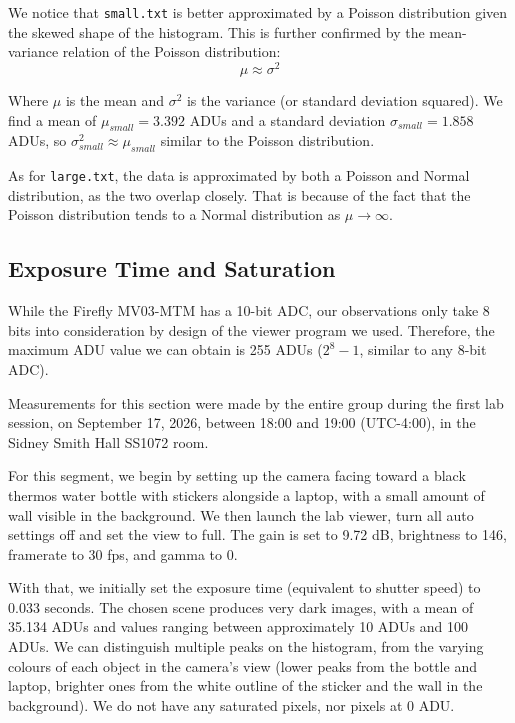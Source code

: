 \documentclass[preprint2]{aastex702}
\begin{document}
			We notice that \texttt{small.txt} is better approximated by a Poisson distribution given the skewed shape of the histogram. This is further confirmed by the mean-variance relation of the Poisson distribution:
			\begin{equation}\label{poisson-mean-var}
				\mu \approx \sigma^2
			\end{equation}

			Where $\mu$ is the mean and $\sigma^2$ is the variance (or standard deviation squared). We find a mean of $\mu_{small}=3.392$ ADUs and a standard deviation $\sigma_{small}=1.858$ ADUs, so $\sigma_{small}^2 \approx \mu_{small}$ similar to the Poisson distribution.

			As for \texttt{large.txt}, the data is approximated by both a Poisson and Normal distribution, as the two overlap closely. That is because of the fact that the Poisson distribution tends to a Normal distribution as $\mu \to \infty$.

		\subsection{Exposure Time and Saturation}\label{ssec:4.2.1}

		While the Firefly MV03-MTM has a 10-bit ADC, our observations only take 8 bits into consideration by design of the viewer program we used. Therefore, the maximum ADU value we can obtain is 255 ADUs ($2^8 - 1$, similar to any 8-bit ADC).

			Measurements for this section were made by the entire group during the first lab session, on September 17, 2026, between 18:00 and 19:00 (UTC-4:00), in the Sidney Smith Hall SS1072 room.

			For this segment, we begin by setting up the camera facing toward a black thermos water bottle with stickers alongside a laptop, with a small amount of wall visible in the background. We then launch the lab viewer, turn all auto settings off and set the view to full. The gain is set to 9.72 dB, brightness to 146, framerate to 30 fps, and gamma to 0. 

			With that, we initially set the exposure time (equivalent to shutter speed) to 0.033 seconds. The chosen scene produces very dark images, with a mean of 35.134 ADUs and values ranging between approximately 10 ADUs and 100 ADUs. We can distinguish multiple peaks on the histogram, from the varying colours of each object in the camera's view (lower peaks from the bottle and laptop, brighter ones from the white outline of the sticker and the wall in the background). We do not have any saturated pixels, nor pixels at 0 ADU.
\end{document}
